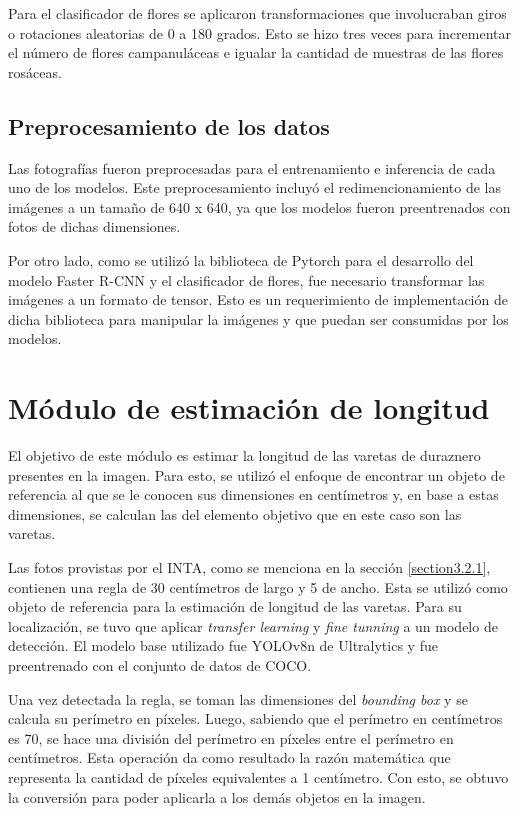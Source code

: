 Para el clasificador de flores se aplicaron transformaciones que involucraban giros o rotaciones aleatorias de 0 a 180 grados. Esto se hizo tres veces para incrementar el número de flores campanuláceas e igualar la cantidad de muestras de las flores rosáceas.

\subsection{Preprocesamiento de los datos}

Las fotografías fueron preprocesadas para el entrenamiento e inferencia de cada uno de los modelos. Este preprocesamiento incluyó el redimencionamiento de las imágenes a un tamaño de 640 x 640, ya que los modelos fueron preentrenados con fotos de dichas dimensiones.

Por otro lado, como se utilizó la biblioteca de Pytorch para el desarrollo del modelo Faster R-CNN y el clasificador de flores, fue necesario transformar las imágenes a un formato de tensor. Esto es un requerimiento de implementación de dicha biblioteca para manipular la imágenes y que puedan ser consumidas por los modelos. 

\section{Módulo de estimación de longitud}

El objetivo de este módulo es estimar la longitud de las varetas de duraznero presentes en la imagen. Para esto, se utilizó el enfoque de encontrar un objeto de referencia al que se le conocen sus dimensiones en centímetros y, en base a estas dimensiones, se calculan las del elemento objetivo que en este caso son las varetas. 

Las fotos provistas por el INTA, como se menciona en la sección \ref{section3.2.1}, contienen una regla de 30 centímetros de largo y 5 de ancho. Esta se utilizó como objeto de referencia para la estimación de longitud de las varetas. Para su localización, se tuvo que aplicar \textit{transfer learning} y \textit{fine tunning} a un modelo de detección. El modelo base utilizado fue YOLOv8n de Ultralytics y fue preentrenado con el conjunto de datos de COCO.

Una vez detectada la regla, se toman las dimensiones del \textit{bounding box} y se calcula su perímetro en píxeles. Luego, sabiendo que el perímetro en centímetros es 70, se hace una división del perímetro en píxeles entre el perímetro en centímetros. Esta operación da como resultado la razón matemática que representa la cantidad de píxeles equivalentes a 1 centímetro. Con esto, se obtuvo la conversión para poder aplicarla a los demás objetos en la imagen.

